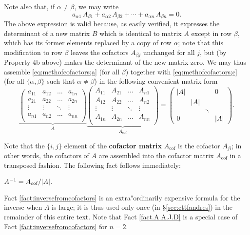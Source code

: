 Note also that, if $\alpha\ne \beta$, we may write
\begin{equation}
a_{\alpha 1}\,A_{\beta 1} + a_{\alpha 2}\,A_{\beta 2} + \cdots + a_{\alpha n}\,A_{\beta n} =0.
 \label{eq:methofcofactors;c}
\end{equation}
The above expression is valid because, as easily verified, it expresses the determinant of a new matrix $B$ which is identical to matrix $A$ except in row 
$\beta$, which has its former elements replaced by a copy of row $\alpha$; note that this modification to row $\beta$ leaves the cofactors $A_{\beta j}$ unchanged for all $j$, but (by Property 4b above)
makes the determinant of the new matrix zero. We may thus assemble \eqref{eq:methofcofactors;a} (for all $\beta$) together with \eqref{eq:methofcofactors;c} (for all $\{\alpha,\beta\}$ such that $\alpha\ne\beta$)
in the following convenient matrix form
\begin{equation*}
  \underbrace{\begin{pmatrix} a_{11} & a_{12} & \ldots & a_{1n} \\ a_{21} & a_{22} & \ldots & a_{2n} \\
  \vdots & \vdots & \ddots & \vdots \\ a_{n1} & a_{n2} & \ldots & a_{nn} \\ \end{pmatrix}}_A
  \underbrace{\begin{pmatrix} A_{11} & A_{21} & \ldots & A_{n1} \\ A_{12} & A_{22} & \ldots & A_{n2} \\
  \vdots & \vdots & \ddots & \vdots \\ A_{1n} & A_{2n} & \ldots & A_{nn} \\ \end{pmatrix}}_{A_\textrm{cof}} =
  \begin{pmatrix} |A| & & & 0 \\ & |A| & & \\ & & \ddots & \\ 0 & & & |A| \end{pmatrix}.
\end{equation*}
\eject

\noindent Note that the $\{i,j\}$ element of the {\bf cofactor matrix} $A_{\textrm{cof}}$ is the cofactor $A_{ji}$; in other words, the cofactors of $A$ are assembled into the cofactor matrix $A_{\textrm{cof}}$ in a transposed fashion.
The following fact follows immediately:
\begin{fact} \label{fact:inversefromcofactors} $A^{-1}=A_{\textrm{\rm cof}} / |A|$.
\end{fact}
Fact \ref{fact:inversefromcofactors} is an extra"ordinarily expensive formula for the inverse when $A$ is large;
it is thus used only once (in \S \ref{sec:cttfandres}) in the remainder of this entire text.
Note that Fact \ref{fact.A.A.J.D} is a special case of Fact \ref{fact:inversefromcofactors} for $n=2$.

